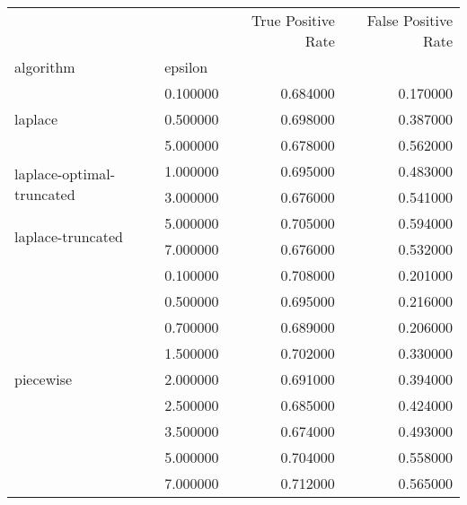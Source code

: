 \begin{tabular}{llrr}
\toprule
 &  & True Positive Rate & False Positive Rate \\
algorithm & epsilon &  &  \\
\midrule
\multirow[t]{3}{*}{laplace} & 0.100000 & 0.684000 & 0.170000 \\
 & 0.500000 & 0.698000 & 0.387000 \\
 & 5.000000 & 0.678000 & 0.562000 \\
\cline{1-4}
\multirow[t]{2}{*}{laplace-optimal-truncated} & 1.000000 & 0.695000 & 0.483000 \\
 & 3.000000 & 0.676000 & 0.541000 \\
\cline{1-4}
\multirow[t]{2}{*}{laplace-truncated} & 5.000000 & 0.705000 & 0.594000 \\
 & 7.000000 & 0.676000 & 0.532000 \\
\cline{1-4}
\multirow[t]{9}{*}{piecewise} & 0.100000 & 0.708000 & 0.201000 \\
 & 0.500000 & 0.695000 & 0.216000 \\
 & 0.700000 & 0.689000 & 0.206000 \\
 & 1.500000 & 0.702000 & 0.330000 \\
 & 2.000000 & 0.691000 & 0.394000 \\
 & 2.500000 & 0.685000 & 0.424000 \\
 & 3.500000 & 0.674000 & 0.493000 \\
 & 5.000000 & 0.704000 & 0.558000 \\
 & 7.000000 & 0.712000 & 0.565000 \\
\cline{1-4}
\bottomrule
\end{tabular}

